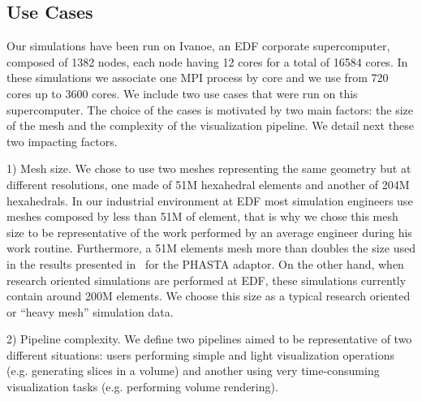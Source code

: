 \subsection{Use Cases}

Our simulations have been run on Ivanoe, an EDF corporate supercomputer,
composed of 1382 nodes, each node having 12 cores for a total of 16584 cores. In
these simulations we associate one MPI process by core and we use from 720 cores up
to 3600 cores. We include two use cases that were run on this supercomputer. The
choice of the cases is motivated by two main factors: the size of the mesh and
the complexity of the visualization pipeline. We detail next these two impacting factors.

1) Mesh size. We chose to use two meshes representing the same geometry but at
different resolutions, one made of 51M hexahedral elements and another of 204M
hexahedrals. In our industrial environment at EDF most simulation engineers use
meshes composed by less than 51M of element, that is why we chose this mesh size to be
representative of the work performed by an average engineer during his work routine.
Furthermore, a 51M elements mesh more than doubles the size used in the results
presented in~\cite{6092322} for the PHASTA adaptor. On the other hand, when research
oriented simulations are performed at EDF, these simulations currently contain around 200M
elements. We choose this size as a typical research oriented or ``heavy mesh'' simulation data.

2) Pipeline complexity. We define two pipelines aimed to be representative of two
different situations: users performing simple and light visualization
operations (e.g. generating slices in a volume) and another using very
time-consuming visualization tasks (e.g. performing volume rendering).

